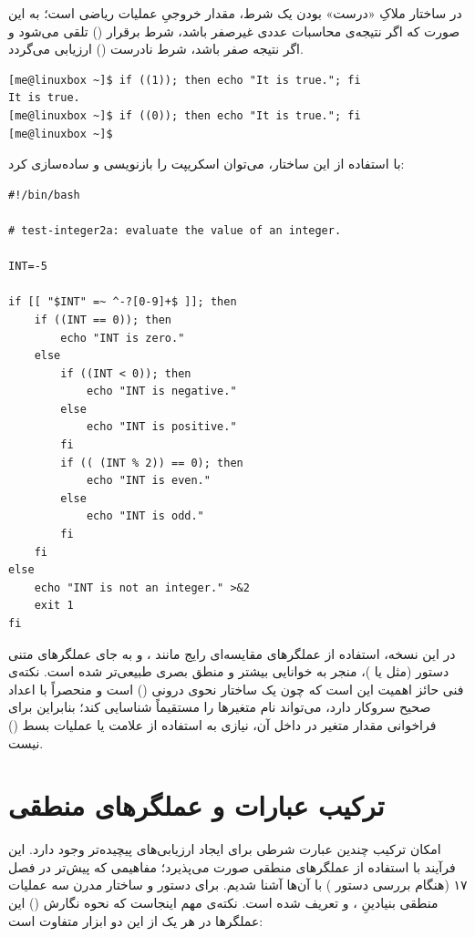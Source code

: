 در ساختار \cmd{(( ))} ملاکِ «درست» بودن یک شرط، مقدار خروجیِ عملیات ریاضی است؛ به این صورت که اگر نتیجه‌ی محاسبات عددی غیرصفر باشد، شرط برقرار () تلقی می‌شود و اگر نتیجه صفر باشد، شرط نادرست () ارزیابی می‌گردد.

\begin{latin}
\begin{lstlisting}
[me@linuxbox ~]$ if ((1)); then echo "It is true."; fi
It is true.
[me@linuxbox ~]$ if ((0)); then echo "It is true."; fi
[me@linuxbox ~]$
\end{lstlisting}
\end{latin}

با استفاده از این ساختار، می‌توان اسکریپت  را بازنویسی و ساده‌سازی کرد:

\begin{latin}
\begin{lstlisting}
#!/bin/bash

# test-integer2a: evaluate the value of an integer.

INT=-5

if [[ "$INT" =~ ^-?[0-9]+$ ]]; then
    if ((INT == 0)); then
        echo "INT is zero."
    else
        if ((INT < 0)); then
            echo "INT is negative."
        else
            echo "INT is positive."
        fi
        if (( (INT % 2)) == 0); then
            echo "INT is even."
        else
            echo "INT is odd."
        fi
    fi
else
    echo "INT is not an integer." >&2
    exit 1
fi
\end{lstlisting}
\end{latin}

در این نسخه، استفاده از عملگرهای مقایسه‌ای رایج مانند \cmd{==}، \cmd{<} و \cmd{>} به جای عملگرهای متنی دستور  (مثل  یا )، منجر به خوانایی بیشتر و منطق بصری طبیعی‌تر شده است. نکته‌ی فنی حائز اهمیت این است که چون \cmd{(( ))} یک ساختار نحوی درونی () است و منحصراً با اعداد صحیح سروکار دارد، می‌تواند نام متغیرها را مستقیماً شناسایی کند؛ بنابراین برای فراخوانی مقدار متغیر در داخل آن، نیازی به استفاده از علامت \cmd{\$} یا عملیات بسط () نیست.

\section{ترکیب عبارات و عملگرهای منطقی}

امکان ترکیب چندین عبارت شرطی برای ایجاد ارزیابی‌های پیچیده‌تر وجود دارد. این فرآیند با استفاده از عملگرهای منطقی صورت می‌پذیرد؛ مفاهیمی که پیش‌تر در فصل ۱۷ (هنگام بررسی دستور ) با آن‌ها آشنا شدیم. برای دستور  و ساختار مدرن \cmd{[[ ]]} سه عملیات منطقی بنیادینِ ،  و  تعریف شده است. نکته‌ی مهم اینجاست که نحوه نگارش () این عملگرها در هر یک از این دو ابزار متفاوت است:

